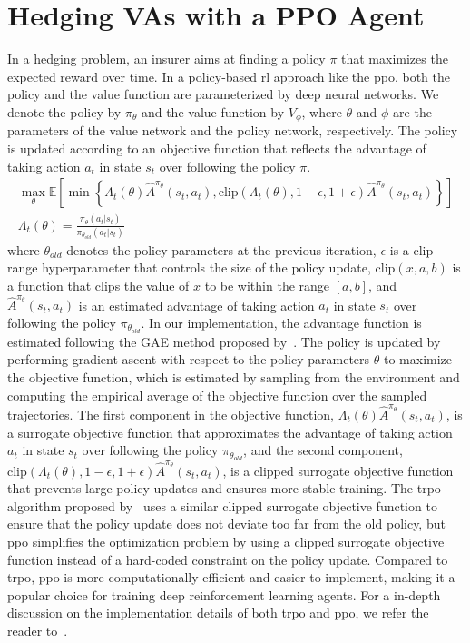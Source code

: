 \section{Hedging VAs with a PPO Agent} \label{sec:PPO}
In a hedging problem, an insurer aims at finding a policy $\pi$ that maximizes the expected reward over time.
In a policy-based \gls{rl} approach like the \gls{ppo}, both the policy and the value function are parameterized by deep neural networks.
We denote the policy by $\pi_{\theta}$ and the value function by $V_{\phi}$, where $\theta$ and $\phi$ are the parameters of the value network and the policy network, respectively.
The policy is updated according to an objective function that reflects the advantage of taking action $a_t$ in state $s_t$ over following the policy $\pi$.
\begin{align}
    \max_{\theta} \mathbb{E}\left[ \min \left\{ \Lambda_t(\theta)\hat{A}^{\pi_{\theta}}(s_t, a_t), \text{clip}(\Lambda_t(\theta), 1-\epsilon, 1 + \epsilon) \hat{A}^{\pi_{\theta}}(s_t, a_t)  \right\} \right] \\
    \Lambda_t(\theta) = \frac{\pi_{\theta}(a_t|s_t)}{\pi_{\theta_{old}}(a_t|s_t)} 
\end{align}
where $\theta_{old}$ denotes the policy parameters at the previous iteration, $\epsilon$ is a clip range hyperparameter that controls the size of the policy update, $\text{clip}(x, a, b)$ is a function that clips the value of $x$ to be within the range $[a, b]$, and $\hat{A}^{\pi_{\theta}}(s_t, a_t)$ is an estimated advantage of taking action $a_t$ in state $s_t$ over following the policy $\pi_{\theta_{old}}$.
In our implementation, the advantage function is estimated following the GAE method proposed by~\cite{schulman2015high}.
The policy is updated by performing gradient ascent with respect to the policy parameters $\theta$ to maximize the objective function, which is estimated by sampling from the environment and computing the empirical average of the objective function over the sampled trajectories.
The first component in the objective function, $\Lambda_t(\theta) \hat{A}^{\pi_{\theta}}(s_t, a_t)$, is a surrogate objective function that approximates the advantage of taking action $a_t$ in state $s_t$ over following the policy $\pi_{\theta_{old}}$, and the second component, $\text{clip}(\Lambda_t(\theta), 1-\epsilon, 1 + \epsilon) \hat{A}^{\pi_{\theta}}(s_t, a_t)$, is a clipped surrogate objective function that prevents large policy updates and ensures more stable training.
The \gls{trpo} algorithm proposed by~\cite{schulman2015trust} uses a similar clipped surrogate objective function to ensure that the policy update does not deviate too far from the old policy, but \gls{ppo} simplifies the optimization problem by using a clipped surrogate objective function instead of a hard-coded constraint on the policy update.
Compared to \gls{trpo}, \gls{ppo} is more computationally efficient and easier to implement, making it a popular choice for training deep reinforcement learning agents.
For a in-depth discussion on the implementation details of both \gls{trpo} and \gls{ppo}, we refer the reader to~\cite{engstrom2020implementation}.

